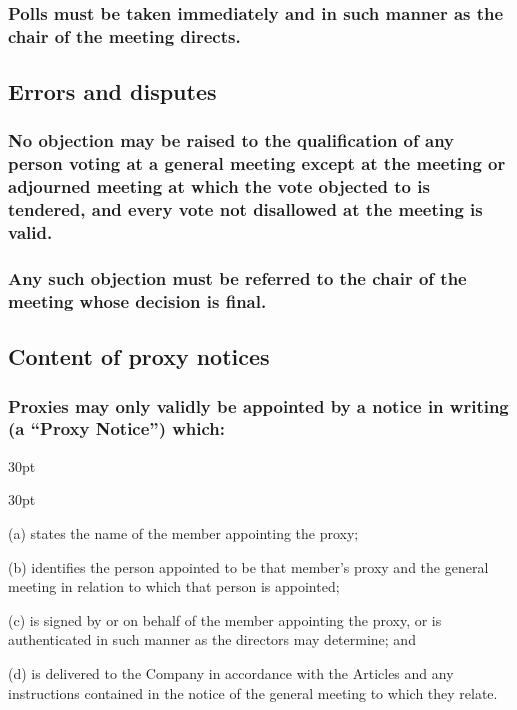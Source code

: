 \documentclass[12pt]{article}
\def\clauseindent{30pt}
\newenvironment{subindentlist}{\begin{adjustwidth}{\clauseindent}{}\begin{labeledlist}{\clauseindent}}{\end{labeledlist}\end{adjustwidth}}
\begin{document}
\subsubsection[Polls to be taken immediately]{Polls must be taken immediately and in such manner as the chair of the meeting directs.}

\subsection{Errors and disputes}
\subsubsection[Disputes and errors of qualification]{No objection may be raised to the qualification of any person voting at a general meeting except at the meeting or adjourned meeting at which the vote objected to is tendered, and every vote not disallowed at the meeting is valid.}
\subsubsection[Decisions on disputes and errors]{Any such objection must be referred to the chair of the meeting whose decision is final.}

\subsection{Content of proxy notices}
\subsubsection[Specifics of content of proxy notices]{Proxies may only validly be appointed by a notice in writing (a ``Proxy Notice'') which:}
\begin{subindentlist}
    \item [(a)] states the name of the member appointing the proxy;
    \item [(b)] identifies the person appointed to be that member's proxy and the general meeting in relation to which that person is appointed;
    \item [(c)] is signed by or on behalf of the member appointing the proxy, or is authenticated in such manner as the directors may determine; and
    \item [(d)] is delivered to the Company in accordance with the Articles and any instructions contained in the notice of the general meeting to which they relate.
\end{subindentlist}
\end{document}
